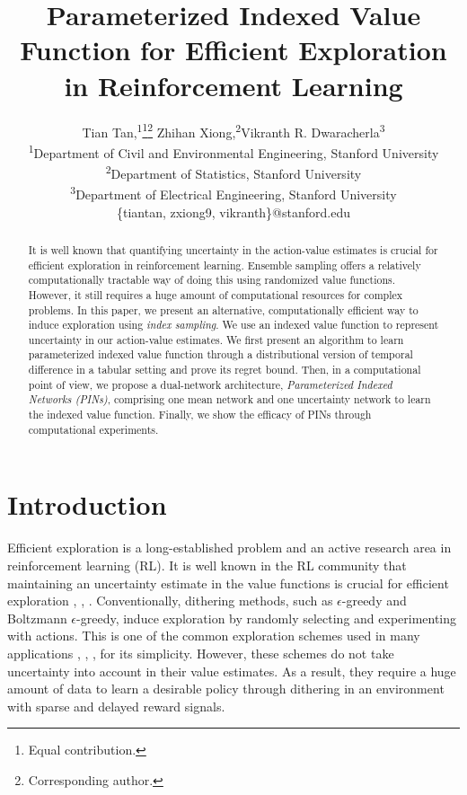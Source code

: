 \documentclass[letterpaper]{article} %
\title{Parameterized Indexed Value Function for Efficient Exploration \\ in Reinforcement Learning}
\author{
Tian Tan,\textsuperscript{\rm 1}\thanks{Equal contribution.}\setcounter{auxFootnote}{\value{footnote}}\thanks{Corresponding author.} 
Zhihan Xiong,\textsuperscript{\rm 2}\footnotemark[\value{auxFootnote}] 
Vikranth R. Dwaracherla\textsuperscript{\rm 3}\\ %
\textsuperscript{\rm 1}Department of Civil and Environmental Engineering, Stanford University\\
\textsuperscript{\rm 2}Department of Statistics, Stanford University\\
\textsuperscript{\rm 3}Department of Electrical Engineering, Stanford University\\
\{tiantan, zxiong9, vikranth\}@stanford.edu 
}
\theoremstyle{definition}
\begin{document}
\maketitle

\begin{abstract}
It is well known that quantifying uncertainty in the action-value estimates is crucial for efficient exploration in reinforcement learning. Ensemble sampling offers a relatively computationally tractable way of doing this using randomized value functions. However, it still requires a huge amount of computational resources for complex problems. In this paper, we present an alternative, computationally efficient way to induce exploration using \emph{index sampling}. We use an indexed value function to represent uncertainty in our action-value estimates. We first present an algorithm to learn parameterized indexed value function through a distributional version of temporal difference in a tabular setting and prove its regret bound. Then, in a computational point of view, we propose a dual-network architecture, \emph{Parameterized Indexed Networks (PINs)}, comprising one mean network and one uncertainty network to learn the indexed value function. Finally, we show the efficacy of PINs through computational experiments.


\end{abstract}


\section{Introduction}
Efficient exploration is a long-established problem and an active research area in reinforcement learning (RL). It is well known in the RL community that maintaining an uncertainty estimate in the value functions is crucial for efficient exploration \cite{russo2018tutorial}, \cite{ghavamzadeh2015bayesian}, \cite{osband2018randomized}. Conventionally, dithering methods, such as $\epsilon$-greedy and Boltzmann $\epsilon$-greedy, induce exploration by randomly selecting and experimenting with actions. This is one of the common exploration schemes used in many applications \cite{mnih2015human}, \cite{he2015deep}, \cite{tan2019cooperative}, for its simplicity. However, these schemes do not take uncertainty into account in their value estimates. As a result, they require a huge amount of data to learn a desirable policy through dithering in an environment with sparse and delayed reward signals.
\end{document}
